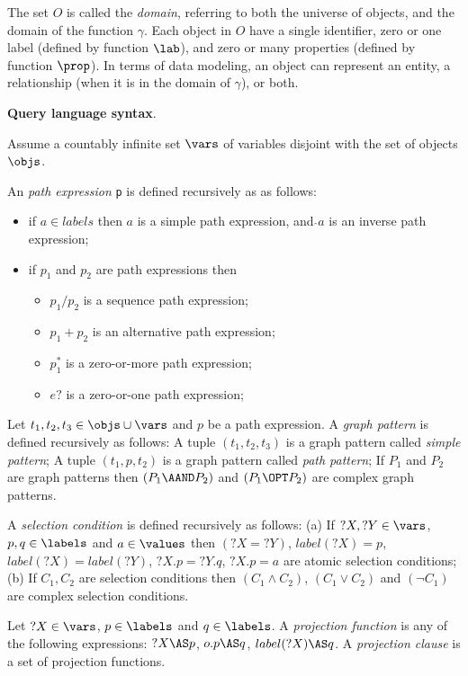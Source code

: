 The set $O$ is called the \textit{domain}, referring to both the universe of objects, and the domain of the function $\gamma$.
Each object in $O$ have a single identifier, zero or one label (defined by function $\lab$), and zero or many properties (defined by function $\prop$). In terms of data modeling, an object can represent an entity, a relationship (when it is in the domain of $\gamma$), or both.

\smallskip
\noindent
\textbf{Query language syntax}.

Assume a countably infinite set $\vars$ of variables disjoint with the set of objects $\objs$.

An \textit{path expression} \texttt{p} is defined recursively as as follows:
\begin{itemize}
\item if $a \in labels$ then $a$ is a simple path expression, and $\hat{ }a$ is an inverse path expression;
\item if $p_1$ and $p_2$ are path expressions then
 \begin{itemize}
  \item $p_1 \slash p_2$ is a sequence path expression;
  \item $p_1 + p_2$ is an alternative path expression;
  \item $p_1^*$ is a zero-or-more path expression;
  \item $e?$ is a zero-or-one path expression; 
 \end{itemize}
\end{itemize}

Let $t_1, t_2, t_3 \in \objs \cup \vars$ and $p$ be a path expression.
A \emph{graph pattern} is defined recursively as follows:
A tuple $(t_1,t_2,t_3)$ is a graph pattern called \emph{simple pattern};
A tuple $(t_1, p, t_2)$ is a graph pattern called \emph{path pattern}; 
If $P_1$ and $P_2$ are graph patterns then $(P_1 \AAND P_2)$ and $(P_1 \OPT P_2)$ are complex graph patterns.

A \emph{selection condition} is defined recursively as follows:
(a) If $?X,?Y \in \vars$, $p,q \in \labels$ and $a \in \values$ then $({?X} = {?Y})$, ${label(?X)} = {p}$, ${label(?X)} = {label(?Y)}$, ${?X.p} = {?Y.q}$, ${?X.p} = {a}$ are atomic selection conditions;
(b) If $C_1, C_2$ are selection conditions then $(C_1 \land C_2)$, $(C_1 \lor C_2)$ and $(\neg C_1)$ are complex selection conditions.

Let $?X \in \vars$, $p \in \labels$ and $q \in \labels$.
A \emph{projection function} is any of the following expressions: $?X \AS p$, $o.p \AS  q$, $label(?X) \AS q$.  
A \emph{projection clause} is a set of projection functions. 

